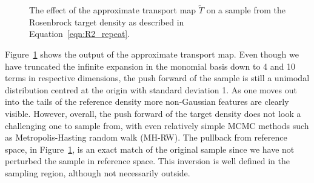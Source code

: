 \documentclass[final]{siamltex}
\begin{document}
\begin{figure}[htpb]
\centering
{}\quad
{}\quad
{}
\caption{The effect of the approximate transport map $\tilde{T}$ on a
  sample from the Rosenbrock target density as described in Equation~\eqref{eqn:R2_repeat}.}
\label{fig:R2_transport}
\end{figure}

Figure~\ref{fig:R2_transport} shows the output of the approximate
transport map. Even though we have truncated the infinite expansion in
the monomial basis down to 4 and 10 terms in respective dimensions,
the push forward of the sample is still a unimodal distribution
centred at the origin with standard deviation 1. As one moves out into
the tails of the reference density more non-Gaussian features are
clearly visible. However, overall, the push forward of the target
density does not look a challenging one to sample from, with even
relatively simple MCMC methods such as Metropolis-Hasting random walk (MH-RW). The pullback from
reference space, in Figure~\ref{fig:R2_transport}, is an exact match
of the original sample since we have not perturbed the sample in
reference space. This inversion is well defined in the sampling
region, although not necessarily outside\cite{parno2018transport}.
\end{document}
